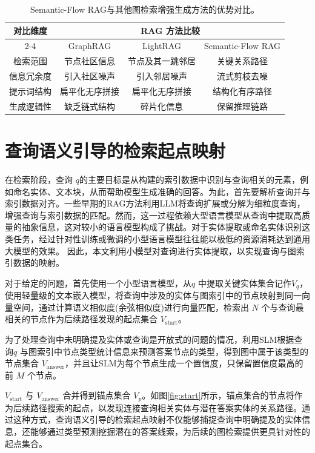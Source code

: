 \documentclass[promaster, vlined]{DissertUESTC}
\begin{document}
\begin{table}[!ht]
\caption{Semantic-Flow RAG与其他图检索增强生成方法的优势对比。}
\begin{tabular}{cccc}
\toprule
\multirow{2}{*}{对比维度} & \multicolumn{3}{c}{RAG 方法比较} \\
\cmidrule{2-4}
& GraphRAG  & LightRAG  & Semantic-Flow RAG   \\
\midrule
检索范围 & 节点社区信息 & 节点及其一跳邻居 & 关键关系路径 \\
信息冗余度 & 引入社区噪声 & 引入邻居噪声 & 流式剪枝去噪\\
提示词结构 & 扁平化无序拼接 & 扁平化无序拼接 & 结构化有序路径 \\
生成逻辑性 & 缺乏链式结构 & 碎片化信息 & 保留推理链路 \\
\bottomrule
\end{tabular}
\label{table_rag_comparison}
\end{table}


\section{查询语义引导的检索起点映射}
在检索阶段，查询 $q$的主要目标是从构建的索引数据中识别与查询相关的元素，例如命名实体、文本块，从而帮助模型生成准确的回答。为此，首先要解析查询并与索引数据对齐。一些早期的RAG方法利用LLM将查询扩展或分解为细粒度查询\cite{chan2024rqrag}，增强查询与索引数据的匹配。然而，这一过程依赖大型语言模型从查询中提取高质量的抽象信息，这对较小的语言模型构成了挑战。对于实体提取或命名实体识别这类任务，经过针对性训练或微调的小型语言模型往往能以极低的资源消耗达到通用大模型的效果\cite{zhou2023universalner,busta2025small}。
因此，本文利用小模型对查询进行实体提取，以实现查询与图索引数据的映射。

对于给定的问题，首先使用一个小型语言模型，从$q$ 中提取关键实体集合记作$V_{q}$，使用轻量级的文本嵌入模型，将查询中涉及的实体与图索引中的节点映射到同一向量空间，通过计算语义相似度(余弦相似度)进行向量匹配，检索出 $N$ 个与查询最相关的节点作为后续路径发现的起点集合 $V_{\text{start}}$。

为了处理查询中未明确提及实体或查询是开放式的问题的情况，利用SLM根据查询$q$ 与图索引中节点类型统计信息来预测答案节点的类型，得到图中属于该类型的节点集合 $V_{\text{answer}}$，并且让SLM为每个节点生成一个置信度，只保留置信度最高的前 $M$ 个节点。

$V_{\text{start}}$ 与 $V_{\text{answer}}$ 合并得到锚点集合 $V_{p}$。如图\ref{fig:start}所示，锚点集合的节点将作为后续路径搜索的起点，以发现连接查询相关实体与潜在答案实体的关系路径。通过这种方式，查询语义引导的检索起点映射不仅能够捕捉查询中明确提及的实体信息，还能够通过类型预测挖掘潜在的答案线索，为后续的图检索提供更具针对性的起点集合。
\end{document}
